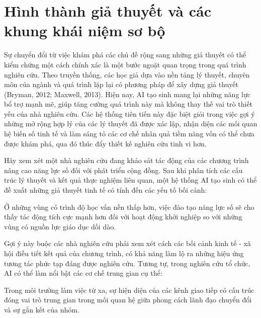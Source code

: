 \section{Hình thành giả thuyết và các khung khái niệm sơ bộ}

Sự chuyển đổi từ việc khám phá các chủ đề rộng sang những giả thuyết có thể kiểm chứng một cách chính xác là một bước ngoặt quan trọng trong quá trình nghiên cứu. Theo truyền thống, các học giả dựa vào nền tảng lý thuyết, chuyên môn của ngành và quá trình lặp lại có phương pháp để xây dựng giả thuyết (Bryman, 2012; Maxwell, 2013). Hiện nay, AI tạo sinh mang lại những năng lực bổ trợ mạnh mẽ, giúp tăng cường quá trình này mà không thay thế vai trò thiết yếu của nhà nghiên cứu. Các hệ thống tiên tiến này đặc biệt giỏi trong việc gợi ý những mở rộng hợp lý của các lý thuyết đã được xác lập, nhận diện các mối quan hệ biến số tinh tế và làm sáng tỏ các cơ chế nhân quả tiềm năng vốn có thể chưa được khám phá, qua đó thúc đẩy thiết kế nghiên cứu tinh vi hơn.

Hãy xem xét một nhà nghiên cứu đang khảo sát tác động của các chương trình nâng cao năng lực số đối với phát triển cộng đồng. Sau khi phân tích các cấu trúc lý thuyết và kết quả thực nghiệm liên quan, một hệ thống AI tạo sinh có thể đề xuất những giả thuyết tinh tế có tính đến các yếu tố bối cảnh:

Ở những vùng có trình độ học vấn nền thấp hơn, việc đào tạo năng lực số sẽ cho thấy tác động tích cực mạnh hơn đối với hoạt động khởi nghiệp so với những vùng có nguồn lực giáo dục dồi dào.

Gợi ý này buộc các nhà nghiên cứu phải xem xét cách các bối cảnh kinh tế - xã hội điều tiết kết quả của chương trình, có khả năng làm lộ ra những hiệu ứng tương tác phức tạp đáng được nghiên cứu. Tương tự, trong nghiên cứu tổ chức, AI có thể làm nổi bật các cơ chế trung gian cụ thể:

Trong môi trường làm việc từ xa, sự hiện diện của các kênh giao tiếp có cấu trúc đóng vai trò trung gian trong mối quan hệ giữa phong cách lãnh đạo chuyển đổi và sự gắn kết của nhóm.


